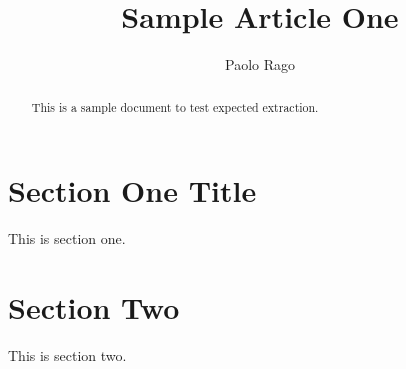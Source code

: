\documentclass{article}
\begin{document}
\title{Sample Article One}
\author{Paolo Rago}
\date{}
\maketitle
\begin{abstract}
This is a sample document to test expected extraction.
\end{abstract}
\section{Section One Title}
This is section one.
\section{Section Two}
This is section two.
\end{document}
